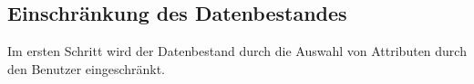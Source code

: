 
\subsection{Einschränkung des Datenbestandes}
Im ersten Schritt wird der Datenbestand durch die Auswahl von Attributen durch den Benutzer eingeschränkt. 








